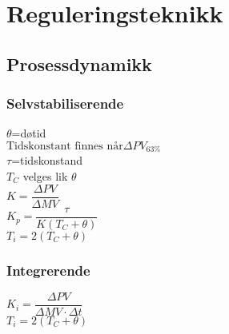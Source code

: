 \section{Reguleringsteknikk}
\subsection*{Prosessdynamikk}
\subsubsection*{Selvstabiliserende}
$\theta$=døtid\\
$ \text{Tidskonstant finnes når} \Delta PV_{63\%}$\\
$\tau$=tidskonstand\\
$T_C$ velges lik $\theta$\\
$K=\dfrac{\Delta PV}{\Delta MV} $\\
$K_p=\dfrac{\tau}{K(T_C+\theta)}$\\
$T_i=2(T_C+\theta)$\\
\subsubsection*{Integrerende}
$K_i=\dfrac{\Delta PV}{\Delta MV \cdot {\Delta t}}$\\
$T_i=2(T_C+\theta)$\\
